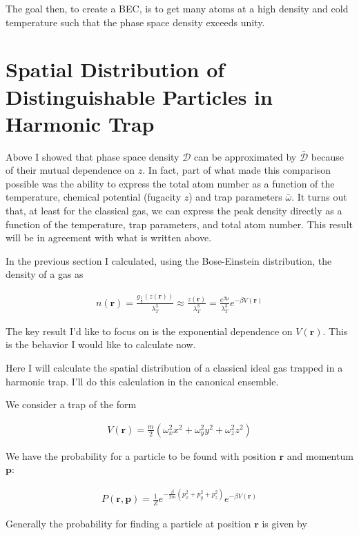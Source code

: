 \documentclass[12pt]{article}
\newcommand{\bv}[1]{\boldsymbol{#1}}
\newcommand{\mc}[1]{\mathcal{#1}}
\begin{document}
The goal then, to create a BEC, is to get many atoms at a high density and cold temperature such that the phase space density exceeds unity.

\section{Spatial Distribution of Distinguishable Particles in Harmonic Trap}

Above I showed that phase space density $\mc{D}$ can be approximated by $\bar{\mc{D}}$ because of their mutual dependence on $z$.
In fact, part of what made this comparison possible was the ability to express the total atom number as a function of the temperature, chemical potential (fugacity $z$) and trap parameters $\bar{\omega}$.
It turns out that, at least for the classical gas, we can express the peak density directly as a function of the temperature, trap parameters, and total atom number.
This result will be in agreement with what is written above.

In the previous section I calculated, using the Bose-Einstein distribution, the density of a gas as

\begin{align}
n(\bv{r}) = \frac{g_{\frac{3}{2}}(z(\bv{r}))}{\lambda_T^3} \approx \frac{z(\bv{r})}{\lambda_T^3} = \frac{e^{\beta \mu}}{\lambda_T^3} e^{-\beta V(\bv{r})}
\end{align}

The key result I'd like to focus on is the exponential dependence on $V(\bv{r})$. This is the behavior I would like to calculate now.

Here I will calculate the spatial distribution of a classical ideal gas trapped in a harmonic trap.
I'll do this calculation in the canonical ensemble.

We consider a trap of the form

\begin{align}
V(\bv{r}) = \frac{m}{2}\left(\omega_x^2 x^2+\omega_y^2 y^2+\omega_z^2 z^2\right)
\end{align}

We have the probability for a particle to be found with position $\bv{r}$ and momentum $\bv{p}$:

\begin{align}
P(\bv{r},\bv{p}) = \frac{1}{Z} e^{-\frac{\beta}{2m}(p_x^2+p_y^2+p_z^2)} e^{-\beta V(\bv{r})}
\end{align}

Generally the probability for finding a particle at position $\bv{r}$ is given by
\end{document}
